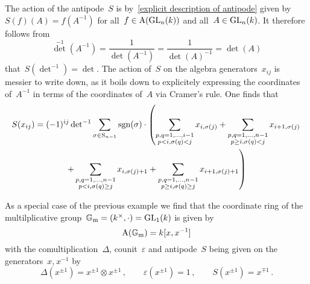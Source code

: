\begin{example}
  The action of the antipode~$S$ is by~\eqref{explicit description of antipode} given by~$S(f)(A) = f(A^{-1})$ for all~$f \in \operatorname{A}(\operatorname{GL}_n(k))$ and all~$A \in \operatorname{GL}_n(k)$.
  It therefore follows from
  \[
      \det^{-1}\left( A^{-1} \right)
    = \frac{1}{\det(A^{-1})}
    = \frac{1}{\det(A)^{-1}}
    = \det(A)
  \]
  that~$S(\det^{-1}) = \det$.
  The action of~$S$ on the algebra generators~$x_{ij}$ is messier to write down, as it boils down to explicitely expressing the coordinates of~$A^{-1}$ in terms of the coordinates of~$A$ via Cramer’s rule.
  One finds that
  \begin{multline*}
      S(x_{ij})
    = (-1)^{ij} \operatorname{det}^{-1}
      \sum_{\sigma \in \operatorname{S}_{n-1}}
      \operatorname{sgn}(\sigma)
      \cdot
      \left(
        \sum_{\substack{p,q=1,\dotsc,i-1 \\ p < i, \sigma(q) < j}}
        x_{i,\sigma(j)}
        +
        \sum_{\substack{p,q=1,\dotsc,n-1 \\ p \geq i, \sigma(q) < j}}
        x_{i+1,\sigma(j)}
      \right.
    \\
      \left.
        +
        \sum_{\substack{p,q=1,\dotsc,n-1 \\ p < i, \sigma(q) \geq j}}
        x_{i,\sigma(j)+1}
        +
        \sum_{\substack{p,q=1,\dotsc,n-1 \\ p \geq i, \sigma(q) \geq j}}
        x_{i+1,\sigma(j)+1}
        \right)
  \end{multline*}
\end{example}


\begin{example}
  As a special case of the previous example we find that the coordinate ring of the multilplicative group~$\mathbb{G}_{\text{m}} = (k^\times, \cdot) = \operatorname{GL}_1(k)$ is given by
  \[
      \operatorname{A}(\mathbb{G}_{\text{m}})
    = k[x, x^{-1}]
  \]
  with the comultiplication~$\Delta$, counit~$\varepsilon$ and antipode~$S$ being given on the generators~$x$,$~x^{-1}$ by
  \[
      \Delta\left( x^{\pm 1} \right)
    = x^{\pm 1} \otimes x^{\pm 1} \,,
    \qquad
      \varepsilon\left( x^{\pm 1} \right)
    = 1 \,,
    \qquad
      S\left( x^{\pm 1} \right)
    = x^{\mp 1} \,.
  \]
\end{example}




